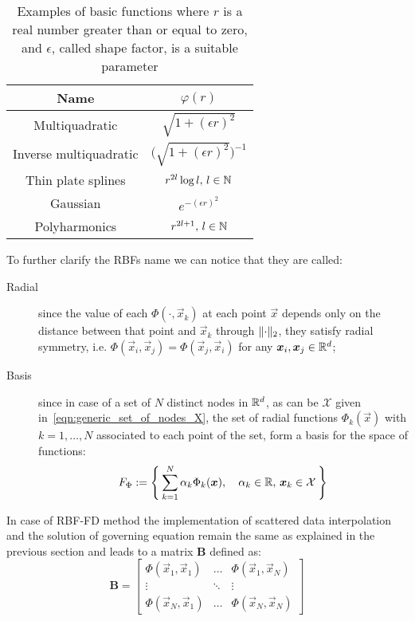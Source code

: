 \begin{table}
	\caption{Examples of basic functions where $r$ is a real number greater than or equal to zero, and $\epsilon$, called shape factor, is a suitable parameter}
	\label{tab:basic_functions}
	\centering
	\begin{tabular}{cc}
		\toprule
		Name										&  $\varphi(r)$																	\\
		\midrule
		Multiquadratic					 			&  $\sqrt{1+(\epsilon r)^2}$													\\
		Inverse multiquadratic	 					&  $\big(  \sqrt{1 + (\epsilon r)^2}  \big)^{-1}$  								\\
		Thin plate splines			   				&  $r^{2l} \log l, \, l\in\mathbb{N}$													\\
		Gaussian							    	&  $e^{- (\epsilon r)^2}$												  		\\
		Polyharmonics								&  $r^{2l + 1}, \, l\in\mathbb{N}$														\\
		\bottomrule
	\end{tabular}
\end{table}

To further clarify the RBFs name we can notice that they are called:
\begin{description}
	\item[Radial] since the value of each $\Phi(\cdot, \vec{x}_k)$ at each point $\vec{x}$ depends only on the distance between that point and $\vec{x}_k$ through $\lVert\cdot\rVert_2$, they satisfy radial symmetry, i.e. $\Phi(\vec{x}_i, \vec{x}_j) = \Phi(\vec{x}_j, \vec{x}_i)$ for any $\boldsymbol{x}_i, \boldsymbol{x}_j \in \mathbb{R}^d$;
	\item[Basis] since in case of a set of $N$ distinct nodes in $\mathbb{R}^d$, as can be $\mathcal{X}$ given in~\eqref{eqn:generic_set_of_nodes_X}, the set of radial functions $\Phi_k{(\vec{x})}$ with $k=1, \dots, N$ associated to each point of the set, form a basis for the space of functions:
	\[
	F_{\Phi} := \Set{ \sum_{k=1}^{N} \alpha_k \Phi_k{(\boldsymbol{x})},  \quad \alpha_k \in\mathbb{R}, \, \boldsymbol{x}_k \in \mathcal{X}}
	\]
\end{description}

In case of RBF-FD method the implementation of scattered data interpolation and the solution of governing equation remain the same as explained in the previous section and leads to a matrix $\boldsymbol{B}$ defined as:
\begin{equation}
	\boldsymbol{B} =
	\begin{bmatrix}
		\Phi(\vec{x}_1, \vec{x}_1)  & 	\dots 	& 	\Phi(\vec{x}_1, \vec{x}_N)  \\
		\vdots											& \ddots &  \vdots											  \\
		\Phi(\vec{x}_N, \vec{x}_1)  & 	\dots 	& 	\Phi(\vec{x}_N, \vec{x}_N)
	\end{bmatrix}
\end{equation}

